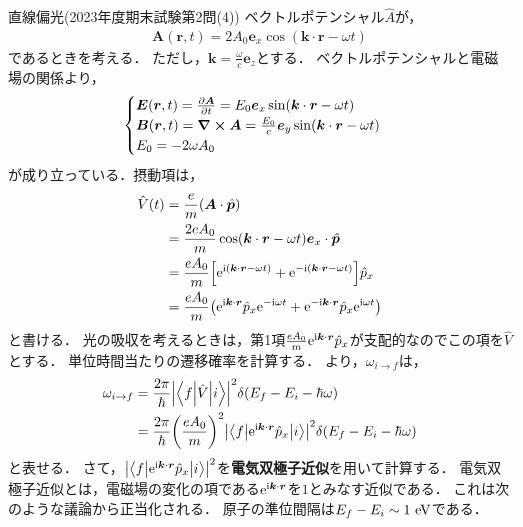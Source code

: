 \documentclass{report}
\begin{document}
  \begin{myex}{直線偏光(2023年度期末試験第2問(4))}{}
    ベクトルポテンシャル$\hat{A}$が，
    \begin{align}
      \bm{A}(\bm{r}, t) = 2A_0 \bm{e}_x \cos(\bm{k} \cdot \bm{r} - \omega t)
    \end{align}
    であるときを考える．
    ただし，$\bm{k} = \frac{\omega}{c}\bm{e}_z$とする．
    ベクトルポテンシャルと電磁場の関係より，
    \begin{align}
      \begin{cases}
      \bm{E}(\bm{r}, t) = \pdv{\bm{A}}{t} = E_0 \bm{e}_x \sin(\bm{k} \cdot \bm{r} - \omega t)\\
      \bm{B}(\bm{r}, t) = \curl\bm{A} = \frac{E_0}{c}\bm{e}_y \sin(\bm{k} \cdot \bm{r} - \omega t)\\
      E_0 = -2 \omega A_0
      \end{cases}
    \end{align}
    が成り立っている．摂動項は，
    \begin{align}
      \hat{V}(t) &= \frac{e}{m}(\bm{A}\cdot\hat{\bm{p}}) \\
      &= \frac{2eA_0}{m}\cos(\bm{k} \cdot \bm{r} - \omega t)\bm{e}_x\cdot\hat{\bm{p}} \\
      &= \frac{eA_0}{m}\qty[\mathrm{e}^{\mathrm{i}(\bm{k}\cdot\bm{r} - \omega t)} + \mathrm{e}^{-\mathrm{i}(\bm{k}\cdot\bm{r} - \omega t)}]\hat{p}_x\\
      &= \frac{eA_0}{m}\qty(\mathrm{e}^{\mathrm{i}\bm{k}\cdot\bm{r}}\hat{p}_x\mathrm{e}^{-\mathrm{i}\omega t} + \mathrm{e}^{-\mathrm{i} \bm{k}\cdot\bm{r}}\hat{p}_x \mathrm{e}^{\mathrm{i} \omega t})
    \end{align}
    と書ける．
    光の吸収を考えるときは，第1項$\frac{eA_0}{m}\mathrm{e}^{\mathrm{i}\bm{k}\cdot\bm{r}}\hat{p}_x$が支配的なのでこの項を$\hat{V}$とする．
    単位時間当たりの遷移確率を計算する．
    より，$\omega_{i\to f}$は，
    \begin{align}
      \omega_{i\to f} &= \frac{2\pi}{\hbar} \abs{\mel**{f}{\hat{V}}{i}}^2\delta(E_f - E_i - \hbar \omega) \\
      &= \frac{2 \pi}{\hbar}\qty(\frac{e A_0}{m})^2 \abs{\mel**{f}{\mathrm{e}^{\mathrm{i}\bm{k}\cdot \bm{r}}\hat{p}_x}{i}}^2 \delta(E_f - E_i - \hbar \omega)
    \end{align}
    と表せる．
    さて，$\abs{\mel**{f}{\mathrm{e}^{\mathrm{i}\bm{k}\cdot\bm{r}}\hat{p}_x}{i}}^2$を\textbf{電気双極子近似}を用いて計算する．
    電気双極子近似とは，電磁場の変化の項である$\mathrm{e}^{\mathrm{i}\bm{k}\cdot\bm{r}}$を$1$とみなす近似である．
    これは次のような議論から正当化される．
    原子の準位間隔は$E_f - E_i \sim 1\ \mathrm{eV}$である．

\end{myex}
\end{document}
